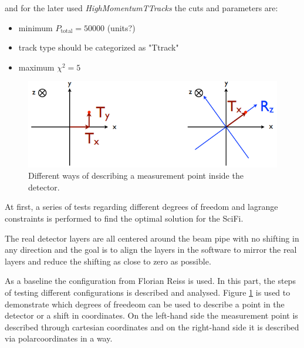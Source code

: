 and for the later used \textit{HighMomentumTTracks} the cuts and parameters are:

\begin{itemize}
  \item minimum $P_{\text{total}} = 50000$ (units?)
  \item track type should be categorized as "Ttrack"
  \item maximum $\chi^2 = 5$
\end{itemize}


\begin{figure}
  \centering
  \includegraphics{plots/point_dofs.png}
  \caption{Different ways of describing a measurement point inside the detector.}
  \label{fig:dofs}
\end{figure}

At first, a series of tests regarding different degrees of freedom and lagrange constraints is performed to find the optimal solution for the SciFi.

The real detector layers are all centered around the beam pipe with no shifting
in any direction and the goal is to align the layers in the software to mirror
the real layers and reduce the shifting as close to zero as possible.

As a baseline the configuration from Florian Reiss is used.
In this part, the steps of testing different configurations is described and analysed.
Figure \ref{fig:dofs} is used to demonstrate which degrees of freedeom can be used
to describe a point in the detector or a shift in coordinates.
On the left-hand side the measurement point is described through cartesian coordinates and on the right-hand side it is described via polarcoordinates in a way.

